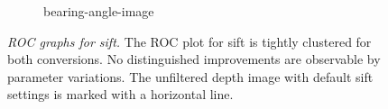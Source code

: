 \begin{figure}[ht]
\begin{subfigure}[t]{0.45\linewidth}
    \caption{\gls{bearing-angle-image}}
\end{subfigure}
\caption[\acrshort{ROC} graphs for \acrshort{sift}]{\emph{\acrshort{ROC} graphs for \acrshort{sift}.} The \acrshort{ROC} plot for \acrshort{sift} is tightly clustered for both conversions. No distinguished improvements are observable by parameter variations. The unfiltered depth image with default \acrshort{sift} settings is marked with a horizontal line.}\label{fig:roc_sift}
\end{figure}
\vspace{-10mm}
